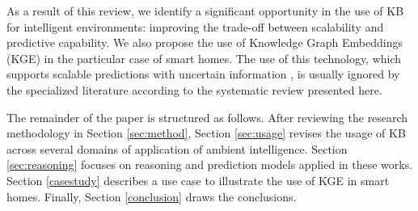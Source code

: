As a result of this review, we identify a significant opportunity in the use of KB for intelligent environments: improving the trade-off between scalability and predictive capability. We also propose the use of Knowledge Graph Embeddings (KGE) in the particular case of smart homes. The use of this technology, which supports scalable predictions with uncertain information \citep{WangMWG17}, is usually ignored by the specialized literature according to the systematic review presented here.




 
The remainder of the paper is structured as follows. After reviewing the research methodology in Section \ref{sec:method}, Section \ref{sec:usage} revises the usage of KB across several domains of application of ambient intelligence. Section \ref{sec:reasoning} focuses on reasoning and prediction models applied in these works.  Section \ref{casestudy} describes a use case to illustrate the use of KGE in smart homes. Finally, Section \ref{conclusion} draws the conclusions.
 







